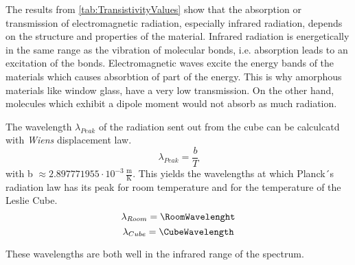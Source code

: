 \documentclass[a4paper,10pt,twocolumn]{article}
\begin{document}
    The results from \autoref{tab:TransistivityValues} show that the absorption or
    transmission of electromagnetic radiation, especially
    infrared radiation, depends on the structure and properties of the material. 
    Infrared radiation is energetically in the same range as the vibration of molecular
    bonds, i.e. absorption leads to an excitation of the bonds. 
    Electromagnetic waves excite the energy bands of the materials which causes absorbtion of part of the energy.
    This is why amorphous materials like window glass, have a very low transmission.
    On the other hand, molecules which exhibit a dipole moment would not absorb as much radiation.
    
    The wavelength $\lambda_{Peak}$ of the radiation sent out from the cube can be calculcatd with \textit{Wiens} displacement law.
    \begin{equation}
        \lambda_{Peak} = \frac{b}{T}
    \end{equation}
    with b $\approx 2.897771955\cdot 10^{-3}\,\frac{\text{m}}{\text{K}}$.
    This yields the wavelengths at which Planck´s radiation law has its peak for room temperature and for the temperature of the Leslie Cube.
    \begin{equation}
        \lambda_{Room} = \RoomWavelenght
    \end{equation}
    \begin{equation}
        \lambda_{Cube} = \CubeWavelength
    \end{equation}
    
    These wavelengths are both well in the infrared range of the spectrum.
    
\end{document}
